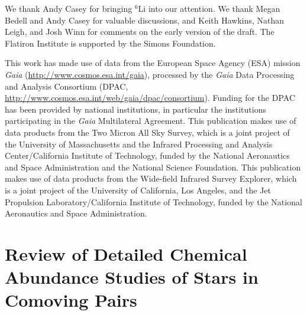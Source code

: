 \documentclass[modern, letterpaper]{aastex61}
\newcommand*\elem[1]{\ensuremath{\mathrm{#1}}}
\begin{document}

\acknowledgements

We thank Andy Casey for bringing $^{6}\elem{Li}$ into our attention.
We thank Megan Bedell and Andy Casey for valuable discussions,
and Keith Hawkins, Nathan Leigh, and Josh Winn for comments
on the early version of the draft.
The Flatiron Institute is supported by the Simons Foundation.

This work has made use of data from the European Space Agency (ESA) mission
{\it Gaia} (\url{http://www.cosmos.esa.int/gaia}), processed by the {\it Gaia}
Data Processing and Analysis Consortium (DPAC,
\url{http://www.cosmos.esa.int/web/gaia/dpac/consortium}). Funding for the DPAC
has been provided by national institutions, in particular the institutions
participating in the {\it Gaia} Multilateral Agreement.
This publication makes use of data products from the Two Micron All Sky Survey,
which is a joint project of the University of Massachusetts and the Infrared
Processing and Analysis Center/California Institute of Technology, funded by
the National Aeronautics and Space Administration and the National Science
Foundation.
This publication makes use of data products from the Wide-field Infrared Survey
Explorer, which is a joint project of the University of California, Los
Angeles, and the Jet Propulsion Laboratory/California Institute of Technology,
funded by the National Aeronautics and Space Administration.




\appendix
\section{
  Review of Detailed Chemical Abundance Studies of Stars in Comoving Pairs}
\label{app:review}
\end{document}
